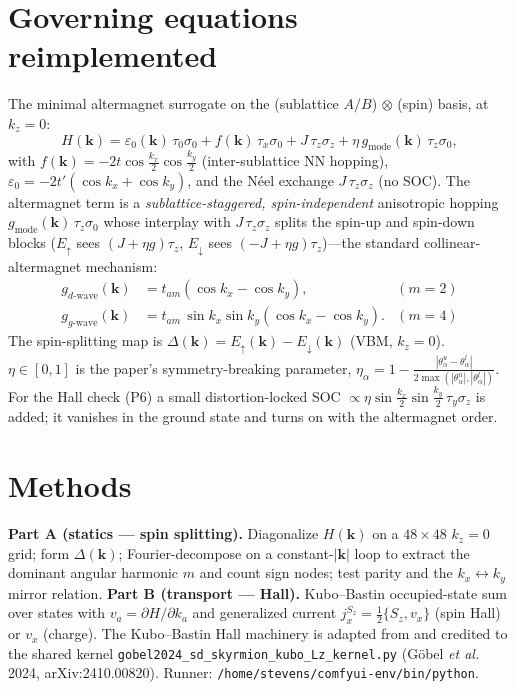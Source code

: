 \documentclass[11pt]{article}
\begin{document}
\section{Governing equations reimplemented}
The minimal altermagnet surrogate on the (sublattice $A/B$)$\,\otimes\,$(spin) basis, at
$k_z=0$:
\begin{equation}
H(\mathbf{k}) = \varepsilon_0(\mathbf{k})\,\tau_0\sigma_0
+ f(\mathbf{k})\,\tau_x\sigma_0
+ J\,\tau_z\sigma_z
+ \eta\,g_{\text{mode}}(\mathbf{k})\,\tau_z\sigma_0 ,
\end{equation}
with $f(\mathbf{k})=-2t\cos\tfrac{k_x}{2}\cos\tfrac{k_y}{2}$ (inter-sublattice NN hopping),
$\varepsilon_0=-2t'(\cos k_x+\cos k_y)$, and the N\'eel exchange $J\,\tau_z\sigma_z$ (no SOC).
The altermagnet term is a \emph{sublattice-staggered, spin-independent} anisotropic
hopping $g_{\text{mode}}(\mathbf{k})\,\tau_z\sigma_0$ whose interplay with $J\,\tau_z\sigma_z$
splits the spin-up and spin-down blocks ($E_\uparrow$ sees $(J+\eta g)\tau_z$,
$E_\downarrow$ sees $(-J+\eta g)\tau_z$)---the standard collinear-altermagnet mechanism:
\begin{align}
g_{d\text{-wave}}(\mathbf{k}) &= t_{am}(\cos k_x - \cos k_y), &(m=2)\\
g_{g\text{-wave}}(\mathbf{k}) &= t_{am}\,\sin k_x \sin k_y (\cos k_x - \cos k_y). &(m=4)
\end{align}
The spin-splitting map is $\Delta(\mathbf{k})=E_\uparrow(\mathbf{k})-E_\downarrow(\mathbf{k})$
(VBM, $k_z{=}0$). $\eta\in[0,1]$ is the paper's symmetry-breaking parameter,
$\eta_\alpha=1-\tfrac{|\theta_\alpha^u-\theta_\alpha^l|}{2\max(|\theta_\alpha^u|,|\theta_\alpha^l|)}$.
For the Hall check (P6) a small distortion-locked SOC $\propto\eta\sin\tfrac{k_x}{2}\sin\tfrac{k_y}{2}\,\tau_y\sigma_z$
is added; it vanishes in the ground state and turns on with the altermagnet order.

\section{Methods}
\textbf{Part A (statics --- spin splitting).} Diagonalize $H(\mathbf{k})$ on a $48\times48$
$k_z{=}0$ grid; form $\Delta(\mathbf{k})$; Fourier-decompose on a constant-$|\mathbf{k}|$
loop to extract the dominant angular harmonic $m$ and count sign nodes; test parity and
the $k_x\!\leftrightarrow\!k_y$ mirror relation.
\textbf{Part B (transport --- Hall).} Kubo--Bastin occupied-state sum over states with
$v_a=\partial H/\partial k_a$ and generalized current $j^{S_z}_x=\tfrac12\{S_z,v_x\}$
(spin Hall) or $v_x$ (charge). The Kubo--Bastin Hall machinery is adapted from and credited to
the shared kernel \texttt{gobel2024\_sd\_skyrmion\_kubo\_Lz\_kernel.py}
(G\"obel \textit{et al.} 2024, arXiv:2410.00820).
Runner: \texttt{/home/stevens/comfyui-env/bin/python}.
\end{document}
